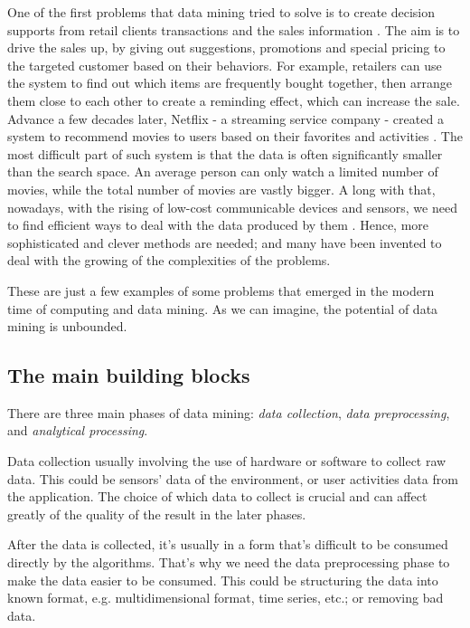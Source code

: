 One of the first problems that data mining tried to solve is to create decision supports from retail clients transactions and the sales information \citep{coenen_datamining_2011}. 
The aim is to drive the sales up, by giving out suggestions, promotions and special pricing to the targeted customer based on their behaviors.
For example, retailers can use the system to find out which items are frequently bought together, then arrange them close to each other to create a reminding effect, which can increase the sale.
Advance a few decades later, Netflix - a streaming service company - created a system to recommend movies to users based on their favorites and activities \citep{netflix_rs_2016}.
The most difficult part of such system is that the data is often significantly smaller than the search space.
An average person can only watch a limited number of movies, while the total number of movies are vastly bigger.
A long with that, nowadays, with the rising of low-cost communicable devices and sensors, we need to find efficient ways to deal with the data produced by them \citep{data_mining_iot_2014}.
Hence, more sophisticated and clever methods are needed; and many have been invented to deal with the growing of the complexities of the problems.

These are just a few examples of some problems that emerged in the modern time of computing and data mining.
As we can imagine, the potential of data mining is unbounded.

\subsection{The main building blocks}
\label{sub:building_blocks}

There are three main phases of data mining: \textit{data collection}, \textit{data preprocessing}, and \textit{analytical processing}.

Data collection usually involving the use of hardware or software to collect raw data.
This could be sensors' data of the environment, or user activities data from the application.
The choice of which data to collect is crucial and can affect greatly of the quality of the result in the later phases.

After the data is collected, it's usually in a form that's difficult to be consumed directly by the algorithms.
That's why we need the data preprocessing phase to make the data easier to be consumed.
This could be structuring the data into known format, e.g. multidimensional format, time series, etc.; or removing bad data.

